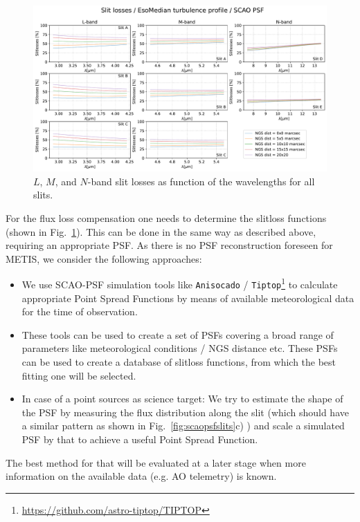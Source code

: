 \begin{landscape}
\begin{figure}[ht!]
  \centering
  \includegraphics[width=1.0\linewidth]{figures/LSS_CrtAlg_files/METIS_slitlosses.pdf}
  \caption{$L$, $M$, and $N$-band slit losses as function of the wavelengths for all slits.}
  \label{fig:slitlosses}
\end{figure}
\end{landscape}
For the flux loss compensation one needs to determine the slitloss functions (shown in Fig.~\ref{fig:slitlosses}). This can be done in the same way as described above, requiring an appropriate \ac{PSF}. As there is no \ac{PSF} reconstruction foreseen for \ac{METIS}, we consider the following approaches:
\begin{itemize}
    \item We use \ac{SCAO}-\ac{PSF} simulation tools like \texttt{Anisocado} / \texttt{Tiptop}\footnote{\url{https://github.com/astro-tiptop/TIPTOP}} to calculate appropriate Point Spread Functions by means of available meteorological data for the time of observation.
    \item These tools can be used to create a set of \ac{PSF}s covering a broad range of parameters like meteorological conditions / \ac{NGS} distance etc. These \ac{PSF}s can be used to create a database of slitloss functions, from which the best fitting one will be selected.
    \item In case of a point sources as science target: We try to estimate the shape of the \ac{PSF} by measuring the flux distribution along the slit (which should have a similar pattern as shown in Fig.~\ref{fig:scaopsfslits}c) ) and scale a simulated \ac{PSF} by that to achieve a useful Point Spread Function.
\end{itemize}
The best method for that will be evaluated at a later stage when more information on the available data (e.g. \ac{AO} telemetry) is known.

